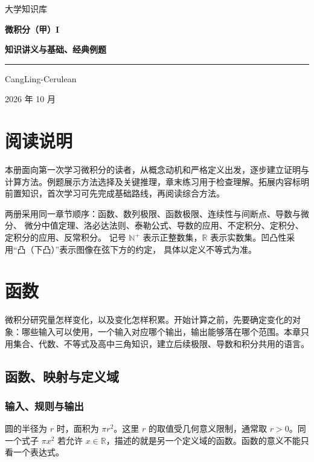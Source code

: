 \documentclass[UTF8,fontset=fandol,12pt,oneside,openany]{ctexrep}
\newcommand{\R}{\mathbb R}
\newcommand{\N}{\mathbb N^{+}}
\theoremstyle{definition}
\begin{document}
\begin{titlepage}
\centering
\vspace*{28mm}
{\Large 大学知识库\par}
\vspace{15mm}
{\Huge\bfseries 微积分（甲）I\par}
\vspace{12mm}
{\LARGE\bfseries 知识讲义与基础、经典例题\par}
\vspace{12mm}
\rule{.65\textwidth}{.5pt}
\vfill
{\large CangLing-Cerulean\par}
\vspace{5mm}
{2026 年 10 月\par}
\vspace*{18mm}
\end{titlepage}
\chapter*{阅读说明}
本册面向第一次学习微积分的读者，从概念动机和严格定义出发，逐步建立证明与计算方法。例题展示方法选择及关键推理，章末练习用于检查理解。拓展内容标明前置知识，首次学习可先完成基础路线，再阅读综合方法。

两册采用同一章节顺序：函数、数列极限、函数极限、连续性与间断点、导数与微分、
微分中值定理、洛必达法则、泰勒公式、导数的应用、不定积分、定积分、定积分的应用、反常积分。
记号 $\N$ 表示正整数集，$\R$ 表示实数集。凹凸性采用“凸（下凸）”表示图像在弦下方的约定，
具体以定义不等式为准。

\tableofcontents
\clearpage
{}
\chapter{函数}
\label{lec:01:chapter}

微积分研究量怎样变化，以及变化怎样积累。开始计算之前，先要确定变化的对象：哪些输入可以使用，一个输入对应哪个输出，输出能够落在哪个范围。本章只用集合、代数、不等式及高中三角知识，建立后续极限、导数和积分共用的语言。

\section{函数、映射与定义域}
\label{lec:01:function}
\subsection{输入、规则与输出}
圆的半径为 $r$ 时，面积为 $\pi r^2$。这里 $r$ 的取值受几何意义限制，通常取 $r>0$。同一个式子 $\pi x^2$ 若允许 $x\in\R$，描述的就是另一个定义域的函数。函数的意义不能只看一个表达式。
\end{document}
